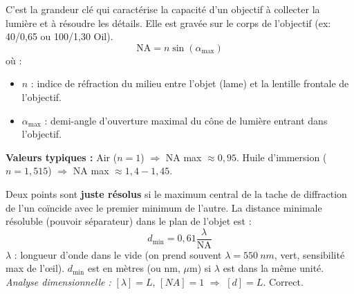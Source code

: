 \documentclass[11pt]{article}
\begin{document}
\begin{definition}
C'est la grandeur clé qui caractérise la capacité d'un objectif à collecter la lumière et à résoudre les détails. Elle est gravée sur le corps de l'objectif (ex: 40/0,65 ou 100/1,30 Oil).
\[
\boxed{\text{NA} = n \sin(\alpha_{\text{max}})}
\]
où :
\begin{itemize}
    \item $n$ : indice de réfraction du milieu entre l'objet (lame) et la lentille frontale de l'objectif.
    \item $\alpha_{\text{max}}$ : demi-angle d'ouverture maximal du cône de lumière entrant dans l'objectif.
\end{itemize}
\textbf{Valeurs typiques :} Air ($n=1$) $\Rightarrow$ NA max $\approx 0,95$. Huile d'immersion ($n=1,515$) $\Rightarrow$ NA max $\approx 1,4 - 1,45$.
\end{definition}

\begin{propriete}
Deux points sont \textbf{juste résolus} si le maximum central de la tache de diffraction de l'un coïncide avec le premier minimum de l'autre.
La distance minimale résoluble (pouvoir séparateur) dans le plan de l'objet est :
\[
\boxed{d_{\text{min}} = 0,61 \frac{\lambda}{\text{NA}}}
\]
$\lambda$ : longueur d'onde dans le vide (on prend souvent $\lambda = \SI{550}{nm}$, vert, sensibilité max de l'œil).
$d_{\text{min}}$ est en mètres (ou nm, $\mu$m) si $\lambda$ est dans la même unité.
\emph{Analyse dimensionnelle :} $[\lambda] = L$, $[NA] = 1$ $\Rightarrow$ $[d] = L$. Correct.
\end{propriete}
\end{document}
